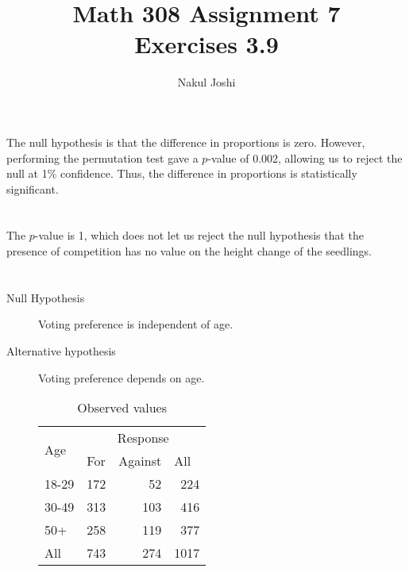 \documentclass[twocolumn]{article}
\title{Math 308 Assignment 7\\Exercises 3.9}
\author{Nakul Joshi}
\newcommand{\setsection}[1]{\setcounter{section}{#1}\addtocounter{section}{-1}\section{}}
\begin{document}
\lstset{language=R}
\graphicspath{ {./img/} }
\maketitle

\setsection{4}

The null hypothesis is that the difference in proportions is zero. However, performing the permutation test gave a $p$-value of 0.002, allowing us to reject the null at 1\% confidence. Thus, the difference in proportions is statistically significant.

\setsection{8}

The $p$-value is 1, which does not let us reject the null hypothesis that the presence of competition has no value on the height change of the seedlings.

\setsection{11}

\begin{description}
\item[Null Hypothesis] Voting preference is independent of age.
\item[Alternative hypothesis] Voting preference depends on age.

\begin{table}[!ht]
\centering
\begin{tabular}{lrrr}
\hline
\multirow{2}{*}{Age} & \multicolumn{3}{c}{Response}                                                     \\ \cline{2-4} 
                     & \multicolumn{1}{l}{For} & \multicolumn{1}{l}{Against} & \multicolumn{1}{l}{All}  \\ \hline
18-29                & 172                     & 52                          & \multicolumn{1}{|r}{224} \\
30-49                & 313                     & 103                         & \multicolumn{1}{|r}{416} \\
50+                  & 258                     & 119                         & \multicolumn{1}{|r}{377} \\ \cline{2-3}
All                  & 743                     & 274                         & 1017                     \\ \hline
\end{tabular}
\caption{Observed values}
\end{table}

\end{description}
\end{document}

